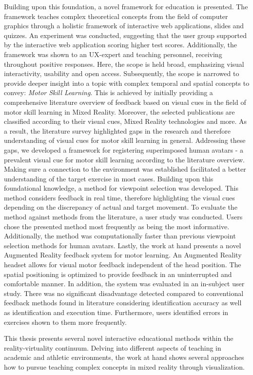 Building upon this foundation, a novel framework for education is presented.
The framework teaches complex theoretical concepts from the field of computer graphics through a holistic framework of interactive web applications, slides and quizzes.
An experiment was conducted, suggesting that the user group supported by the interactive web application scoring higher test scores.
Additionally, the framework was shown to an UX-expert and teaching personnel, receiving throughout positive responses.
Here, the scope is held broad, emphasizing visual interactivity, usability and open access.
Subsequently, the scope is narrowed to provide deeper insight into a topic with complex temporal and spatial concepts to convey: \emph{Motor Skill Learning}.
This is achieved by initially providing a comprehensive literature overview of feedback based on visual cues in the field of motor skill learning in Mixed Reality.
Moreover, the selected publications are classified according to their visual cues, Mixed Reality technologies and more.
As a result, the literature survey highlighted gaps in the research and therefore understanding of visual cues for motor skill learning in general.
Addressing these gaps, we developed a framework for registering superimposed human avatars - a prevalent visual cue for motor skill learning according to the literature overview.
Making sure a connection to the environment was established facilitated a better understanding of the target exercise in most cases.
Building upon this foundational knowledge, a method for viewpoint selection was developed.
This method considers feedback in real time, therefore highlighting the visual cues depending on the discrepancy of actual and target movement.
To evaluate the method against methods from the literature, a user study was conducted.
Users chose the presented method most frequently as being the most informative.
Additionally, the method was computationally faster than previous viewpoint selection methods for human avatars.
Lastly, the work at hand presents a novel Augmented Reality feedback system for motor learning.
An Augmented Reality headset allows for visual motor feedback independent of the head position.
The spatial positioning is optimized to provide feedback in an uninterrupted and comfortable manner.
In addition, the system was evaluated in an in-subject user study.
There was no significant disadvantage detected compared to conventional feedback methods found in literature considering identification accuracy as well as identification and execution time.
Furthermore, users identified errors in exercises shown to them more frequently.

This thesis presents several novel interactive educational methods within the reality-virtuality continuum.
Delving into different aspects of teaching in academic and athletic environments, the work at hand shows several approaches how to pursue teaching complex concepts in mixed reality through visualization.